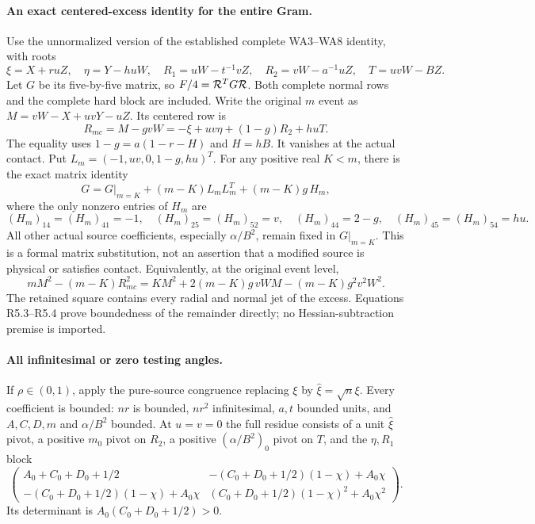 \paragraph{An exact centered-excess identity for the entire Gram.}
Use the unnormalized version of the established complete WA3--WA8 identity,
with roots
\[
 \xi=X+ruZ,\quad\eta=Y-huW,\quad
 R_1=uW-t^{-1}vZ,\quad R_2=vW-a^{-1}uZ,\quad T=uvW-BZ.
\]
Let $G$ be its five-by-five matrix, so $F/4={\cal R}^TG{\cal R}$.
Both complete normal rows and the complete hard block are included.
Write the original $m$ event as $M=vW-X+uvY-uZ$. Its centered row is
\[
 R_{mc}=M-gvW=-\xi+uv\eta+(1-g)R_2+huT.             \tag{R5.2}
\]
The equality uses $1-g=a(1-r-H)$ and $H=hB$. It vanishes at the
actual contact. Put $L_m=(-1,uv,0,1-g,hu)^T$.
For any positive real $K<m$, there is the exact matrix identity
\[
 G=G\big|_{m=K}+(m-K)L_mL_m^T+(m-K)g\,H_m,          \tag{R5.3}
\]
where the only nonzero entries of $H_m$ are
\[
 (H_m)_{14}=(H_m)_{41}=-1,\quad
 (H_m)_{25}=(H_m)_{52}=v,\quad
 (H_m)_{44}=2-g,\quad
 (H_m)_{45}=(H_m)_{54}=hu.                           \tag{R5.4}
\]
All other actual source coefficients, especially $\alpha/B^2$, remain
fixed in $G|_{m=K}$. This is a formal matrix substitution, not an assertion
that a modified source is physical or satisfies contact. Equivalently,
at the original event level,
\[
 mM^2-(m-K)R_{mc}^2
 =KM^2+2(m-K)g\,vWM-(m-K)g^2v^2W^2.                \tag{R5.5}
\]
The retained square contains every radial and normal jet of the excess.
Equations R5.3--R5.4 prove boundedness of the remainder directly; no
Hessian-subtraction premise is imported.

\paragraph{All infinitesimal or zero testing angles.}
If $\rho\in(0,1)$, apply the pure-source congruence replacing $\xi$ by
$\widehat\xi=\sqrt n\xi$. Every coefficient is bounded: $nr$ is
bounded, $nr^2$ infinitesimal, $a,t$ bounded units, and $A,C,D,m$ and
$\alpha/B^2$ bounded. At $u=v=0$ the full residue consists of a unit
$\widehat\xi$ pivot, a positive $m_0$ pivot on $R_2$, a positive
$(\alpha/B^2)_0$ pivot on $T$, and the $\eta,R_1$ block
\[
 \begin{pmatrix}
 A_0+C_0+D_0+1/2&-(C_0+D_0+1/2)(1-\chi)+A_0\chi\\
 -(C_0+D_0+1/2)(1-\chi)+A_0\chi&
 (C_0+D_0+1/2)(1-\chi)^2+A_0\chi^2
 \end{pmatrix}.                                    \tag{R5.6}
\]
Its determinant is $A_0(C_0+D_0+1/2)>0$.

